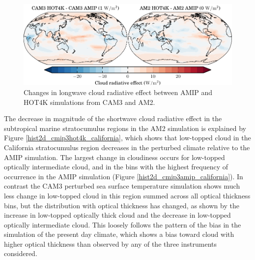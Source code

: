 \begin{figure}
    \centering
    \includegraphics{../graphics/lwcrechanges_cmip3hot4k_map.pdf}
    \caption{Changes in longwave cloud radiative effect between AMIP and HOT4K simulations from CAM3 and AM2.}
    \label{lwcrechanges_cmip3hot4k_map}
\end{figure}


The decrease in magnitude of the shortwave cloud radiative effect in the subtropical marine stratocumulus regions in the AM2 simulation is explained by Figure \ref{hist2d_cmip3hot4k_california}, which shows that low-topped cloud in the California stratocumulus region decreases in the perturbed climate relative to the AMIP simulation. The largest change in cloudiness occurs for low-topped optically intermediate cloud, and in the bins with the highest frequency of occurrence in the AMIP simulation (Figure \ref{hist2d_cmip3amip_california}). In contrast the CAM3 perturbed sea surface temperature simulation shows much less change in low-topped cloud in this region summed across all optical thickness bins, but the distribution with optical thickness has changed, as shown by the increase in low-topped optically thick cloud and the decrease in low-topped optically intermediate cloud. This loosely follows the pattern of the bias in the simulation of the present day climate, which shows a bias toward cloud with higher optical thickness than observed by any of the three instruments considered.

